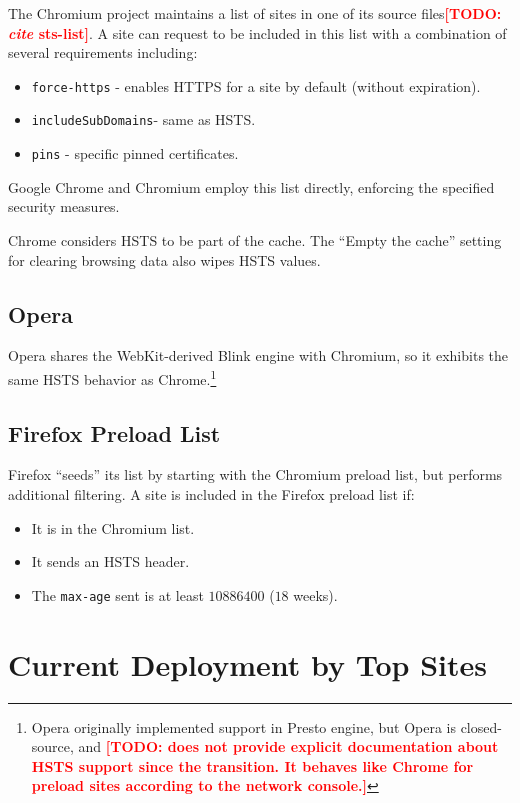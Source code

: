 \documentclass[conference]{./IEEEtran}
\newcommand{\todo}[1]{\textcolor{red}{\textbf{[TODO: #1]}}}
\newcommand{\td}[2]{\textcolor{red}{\textbf{[TODO: {\it{#1}} #2]}}}
\newcommand{\code}[1]{\texttt{#1}}
\newcommand{\iSD}{{\code{includeSubDomains}}}
\theoremstyle{plain}
\begin{document}
The Chromium project maintains a list of sites in one of its source files\td{cite}{sts-list}. A site can request to be included in this list with a combination of several requirements including:

\begin{itemize}
\item \code{force-https} - enables HTTPS for a site by default (without expiration).
\item \iSD - same as HSTS.
\item \code{pins} - specific pinned certificates.
\end{itemize}

Google Chrome and Chromium employ this list directly, enforcing the specified security measures.

Chrome considers HSTS to be part of the cache. The ``Empty the cache'' setting for clearing browsing data also wipes HSTS values.

\subsection{Opera}

Opera shares the WebKit-derived Blink engine with Chromium, so it exhibits the same HSTS behavior as Chrome.\footnote{Opera originally implemented support in Presto engine\cite{opera}, but Opera is closed-source, and \todo{does not provide explicit documentation about HSTS support since the transition. It behaves like Chrome for preload sites according to the network console.}}

\subsection{Firefox Preload List}

Firefox ``seeds'' its list by starting with the Chromium preload list, but performs additional filtering. A site is included in the Firefox preload list if:

\begin{itemize}
\item It is in the Chromium list.
\item It sends an HSTS header.
\item The \code{max-age} sent is at least $10886400$ ($18$ weeks).
\end{itemize}


\section{Current Deployment by Top Sites}
\end{document}
